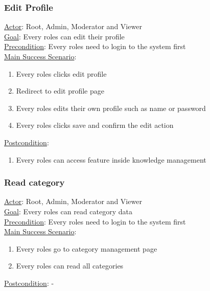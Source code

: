 \documentclass[12pt,oneside,openright,a4paper]{cpe-english-project}
\begin{document}
	\subsubsection{Edit Profile}
	\underline{Actor}: Root, Admin, Moderator and Viewer\\
	\underline{Goal}: Every roles can edit their profile\\
	\underline{Precondition}: Every roles need to login to the system first\\
	\underline{Main Success Scenario}:
	\begin{enumerate}[label={\arabic*.}]
		\item Every roles clicks edit profile       
		\item Redirect to edit profile page
		\item Every roles edits their own profile such as name or password
		\item Every roles clicks save and confirm the edit action
	\end{enumerate}
	\underline{Postcondition}: 
	\begin{enumerate}[label={\arabic*.}]
		\item Every roles can access feature inside knowledge management
	\end{enumerate}

	\subsubsection{Read category}
	\underline{Actor}: Root, Admin, Moderator and Viewer\\
	\underline{Goal}: Every roles can read category data\\
	\underline{Precondition}: Every roles need to login to the system first\\
	\underline{Main Success Scenario}:
	\begin{enumerate}[label={\arabic*.}]
		\item Every roles go to category management page      
		\item Every roles can read all categories
	\end{enumerate}
	\underline{Postcondition}: -
\end{document}
